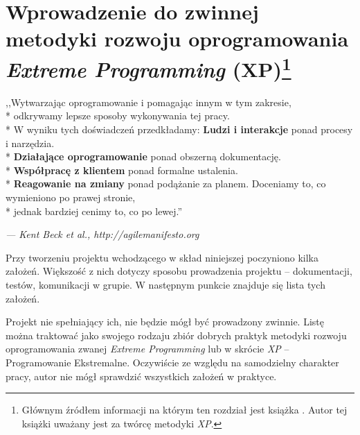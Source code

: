 \newpage
\chapter[Wprowadzenie do zwinnej metodyki rozwoju oprogramowania \textit{Extreme Programming} (XP)]{Wprowadzenie do zwinnej metodyki rozwoju oprogramowania \textit{Extreme Programming} (XP)\footnote{Głównym źródłem informacji na którym  ten rozdział jest książka \cite{Bec99}. Autor tej książki uważany jest za twórcę metodyki \textit{XP}.}}
\label{cha:ZMTO}

\begin{center}
    ,,Wytwarzając oprogramowanie i pomagając innym w tym zakresie,\\*
    odkrywamy lepsze sposoby wykonywania tej pracy.\\*
    W wyniku tych doświadczeń przedkładamy:\newline
    \newline
    \textbf{Ludzi i interakcje} ponad procesy i narzędzia.\\*
    \textbf{Działające oprogramowanie} ponad obszerną dokumentację.\\*
    \textbf{Współpracę z klientem} ponad formalne ustalenia.\\*
    \textbf{Reagowanie na zmiany} ponad podążanie za planem.\newline
    \newline
    Doceniamy to, co wymieniono po prawej stronie,\\*
    jednak bardziej cenimy to, co po lewej.''
\end{center}
\hfill \begin{small}\textit{--- Kent Beck et al., http://agilemanifesto.org}\end{small}

Przy tworzeniu projektu wchodzącego w skład niniejszej poczyniono kilka założeń. Większość z nich dotyczy sposobu prowadzenia projektu -- dokumentacji, testów, komunikacji w grupie. W następnym punkcie znajduje się lista tych założeń.

Projekt nie spełniający ich, nie będzie mógł być prowadzony zwinnie. Listę można traktować jako swojego rodzaju zbiór dobrych praktyk metodyki rozwoju oprogramowania zwanej \textit{Extreme Programming} lub w skrócie \textit{XP} -- Programowanie Ekstremalne. Oczywiście ze względu na samodzielny charakter pracy, autor nie mógł sprawdzić wszystkich założeń w praktyce.

